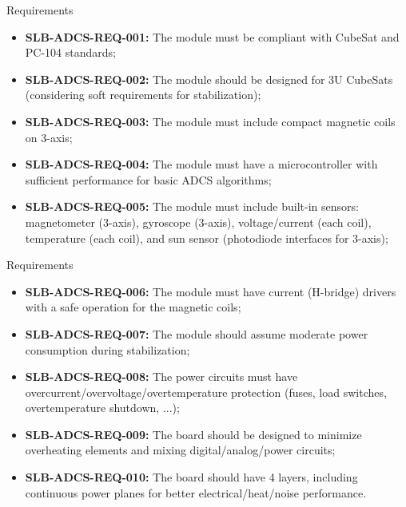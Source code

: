 \begin{frame}{Requirements}

    \begin{itemize}
        \item \textbf{SLB-ADCS-REQ-001:} The module must be compliant with CubeSat and PC-104 standards; 
        \item \textbf{SLB-ADCS-REQ-002:} The module should be designed for 3U CubeSats (considering soft requirements for stabilization);
        \item \textbf{SLB-ADCS-REQ-003:} The module must include compact magnetic coils on 3-axis;
        \item \textbf{SLB-ADCS-REQ-004:} The module must have a microcontroller with sufficient performance for basic ADCS algorithms;  
        \item \textbf{SLB-ADCS-REQ-005:} The module must include built-in sensors: magnetometer (3-axis), gyroscope (3-axis), voltage/current (each coil), temperature (each coil), and sun sensor (photodiode interfaces for 3-axis); 
    \end{itemize}

\end{frame}

\begin{frame}{Requirements}

    \begin{itemize}
        \item \textbf{SLB-ADCS-REQ-006:} The module must have current (H-bridge) drivers with a safe operation for the magnetic coils;  
        \item \textbf{SLB-ADCS-REQ-007:} The module should assume moderate power consumption during stabilization;
        \item \textbf{SLB-ADCS-REQ-008:} The power circuits must have overcurrent/overvoltage/overtemperature protection (fuses, load switches, overtemperature shutdown, ...); 
        \item \textbf{SLB-ADCS-REQ-009:} The board should be designed to minimize overheating elements and mixing digital/analog/power circuits;    
        \item \textbf{SLB-ADCS-REQ-010:} The board should have 4 layers, including continuous power planes for better electrical/heat/noise performance.
    \end{itemize}

\end{frame}